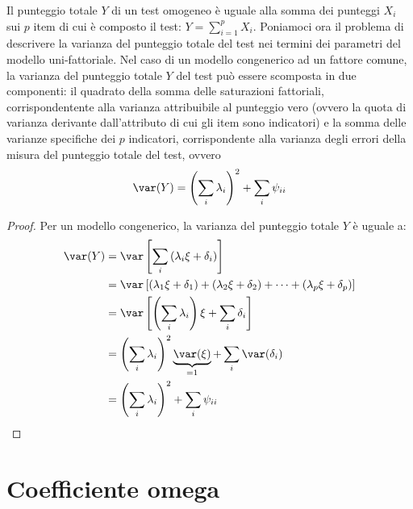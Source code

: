 Il punteggio totale $Y$ di un test omogeneo è uguale alla somma dei punteggi $X_i$ sui $p$ item  di cui è composto il test:
$
Y  = \sum_{i=1}^p X_i.
$
Poniamoci ora il problema di descrivere la varianza del punteggio
totale del test nei termini dei parametri del modello uni-fattoriale. 
 Nel caso di un modello congenerico ad un fattore comune,   
  la varianza del punteggio totale $Y$ del test può essere scomposta in
  due componenti:   il quadrato della somma delle saturazioni fattoriali,
    corrispondentente alla varianza attribuibile al punteggio vero
    (ovvero la quota di varianza derivante dall'attributo di cui gli item sono
    indicatori) e
 la somma delle varianze specifiche dei $p$ indicatori, corrispondente alla varianza degli errori della misura del punteggio totale del test, ovvero
\begin{equation}
 \var(Y) = \left( \sum_i \lambda_i\right)^2 + \sum_i \psi_{ii}
  \label{eq:var_y}
\end{equation}


\begin{proof}

Per un modello congenerico, la varianza del punteggio totale $Y$ è uguale a:
\begin{align}
  \var(Y) &= \var\left[ \sum_i  \left(\lambda_i \xi + \delta_i\right)  \right]\notag\\
  &= \var\left[  (\lambda_1 \xi + \delta_1) +   (\lambda_2 \xi + \delta_2) + \dots +  (\lambda_p \xi + \delta_p)  \right]\notag\\
  &= \var\left[ \left( \sum_i \lambda_i\right) \xi + \sum_i \delta_i\right]\notag\\
  &=  \left( \sum_i \lambda_i\right)^2 \underbrace{\var(\xi)}_{=1} +  \sum_i  \var(\delta_i)\notag\\
  &= \left( \sum_i \lambda_i\right)^2 + \sum_i \psi_{ii}\notag
\end{align}

\end{proof}
 
 
\section{Coefficiente omega}

